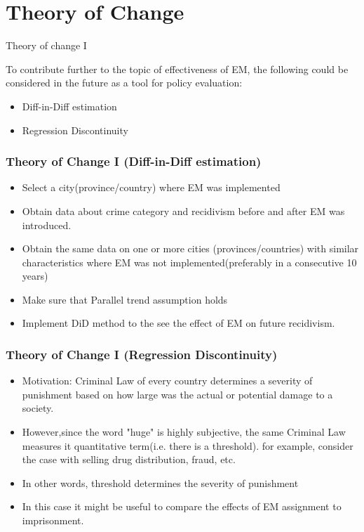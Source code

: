 \documentclass{beamer}
\begin{document}
\section{Theory of Change}
\begin{frame}{Theory of change I}

To contribute further to the topic of effectiveness of EM, the following could be considered in the future as a tool for policy evaluation:
\setlength{\parskip}{3em}
\begin{itemize}
\setlength\itemsep{2em}
        \item Diff-in-Diff estimation 
        \item Regression Discontinuity
                   \end{itemize}
\end{frame}
\begin{frame}
\frametitle{Theory of Change I (Diff-in-Diff estimation)}
                
        \begin{itemize}
        \setlength\itemsep{2em}
            \item Select a city(province/country) where EM was implemented
            \item Obtain data about crime category and recidivism before and after EM was introduced.
            \item Obtain the same data on one or more cities (provinces/countries) with similar characteristics where EM was not implemented(preferably in a consecutive 10 years)
            \item Make sure that Parallel trend assumption holds
            \item Implement DiD method to the see the effect of EM on future recidivism.  
            
        \end{itemize}
       
                  
\end{frame}
\begin{frame}
\frametitle{Theory of Change I (Regression Discontinuity)}
                
        \begin{itemize}
        \setlength\itemsep{1.5em}
            \item Motivation: Criminal Law of every country determines a severity of punishment based on how large was the actual or potential damage to a society.
            \item However,since the word "huge" is highly subjective, the same Criminal Law measures it quantitative term(i.e. there is a threshold). for example, consider the case with selling drug distribution, fraud, etc.
            \item In other words, threshold determines the severity of punishment 
            \item In this case it might be useful to compare the effects of EM assignment to imprisonment. 
             
            
        \end{itemize}
       
                  
\end{frame}
\end{document}
